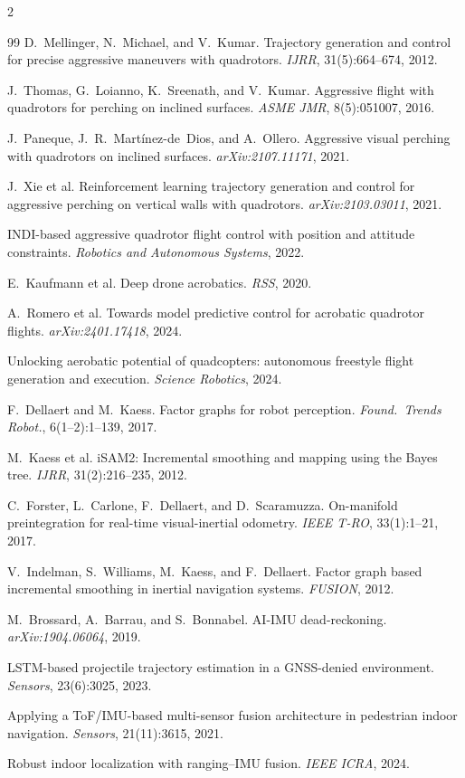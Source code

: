 \documentclass[11pt]{article}
\begin{document}
\begin{multicols}{2}
\begin{thebibliography}{99}
 D.~Mellinger, N.~Michael, and V.~Kumar. Trajectory generation and control for precise aggressive maneuvers with quadrotors. \emph{IJRR}, 31(5):664--674, 2012.

 J.~Thomas, G.~Loianno, K.~Sreenath, and V.~Kumar. Aggressive flight with quadrotors for perching on inclined surfaces. \emph{ASME JMR}, 8(5):051007, 2016.

 J.~Paneque, J.~R.~Mart\'inez-de~Dios, and A.~Ollero. Aggressive visual perching with quadrotors on inclined surfaces. \emph{arXiv:2107.11171}, 2021.

 J.~Xie et al. Reinforcement learning trajectory generation and control for aggressive perching on vertical walls with quadrotors. \emph{arXiv:2103.03011}, 2021.

 INDI-based aggressive quadrotor flight control with position and attitude constraints. \emph{Robotics and Autonomous Systems}, 2022.

 E.~Kaufmann et al. Deep drone acrobatics. \emph{RSS}, 2020.

 A.~Romero et al. Towards model predictive control for acrobatic quadrotor flights. \emph{arXiv:2401.17418}, 2024.

 Unlocking aerobatic potential of quadcopters: autonomous freestyle flight generation and execution. \emph{Science Robotics}, 2024.

 F.~Dellaert and M.~Kaess. Factor graphs for robot perception. \emph{Found.\ Trends Robot.}, 6(1--2):1--139, 2017.

 M.~Kaess et al. iSAM2: Incremental smoothing and mapping using the Bayes tree. \emph{IJRR}, 31(2):216--235, 2012.

 C.~Forster, L.~Carlone, F.~Dellaert, and D.~Scaramuzza. On-manifold preintegration for real-time visual-inertial odometry. \emph{IEEE T-RO}, 33(1):1--21, 2017.

 V.~Indelman, S.~Williams, M.~Kaess, and F.~Dellaert. Factor graph based incremental smoothing in inertial navigation systems. \emph{FUSION}, 2012.

 M.~Brossard, A.~Barrau, and S.~Bonnabel. AI-IMU dead-reckoning. \emph{arXiv:1904.06064}, 2019.

 LSTM-based projectile trajectory estimation in a GNSS-denied environment. \emph{Sensors}, 23(6):3025, 2023.

 Applying a ToF/IMU-based multi-sensor fusion architecture in pedestrian indoor navigation. \emph{Sensors}, 21(11):3615, 2021.

 Robust indoor localization with ranging--IMU fusion. \emph{IEEE ICRA}, 2024.

\end{thebibliography}
\end{multicols}
\end{document}
